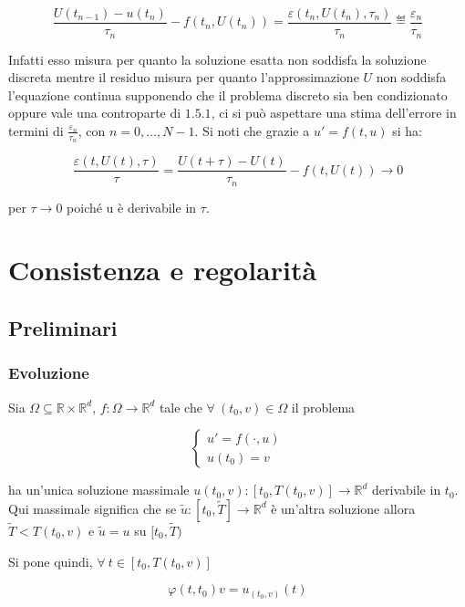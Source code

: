 \documentclass[hidelinks, 10pt]{report}
\begin{document}
\[
\frac{U(t_{n - 1}) - u(t_{n})}{\tau_{n}} - f(t_{n}, U(t_{n})) = \frac{\varepsilon(t_{n}, U(t_{n}),\tau_{n})}{\tau_{n}} \eqdef \frac{\varepsilon_{n}}{\tau_{n}}
\]

Infatti esso misura per quanto la soluzione esatta non soddisfa la soluzione discreta mentre il residuo misura per quanto l'approssimazione $ U $ non soddisfa l'equazione continua supponendo che il problema discreto sia ben condizionato oppure vale una controparte di $ 1.5.1 $, ci si pu\`o aspettare una stima dell'errore in termini di $ \frac{\varepsilon_{n}}{\tau_{n}} $, con $ n = 0, \dotsc, N - 1$. Si noti che grazie a $ u' = f(t, u) $ si ha:	%

\[ \frac{\varepsilon(t, U(t), \tau)}{\tau} = \frac{U(t + \tau) - U(t)}{\tau_{n}} - f(t, U(t)) \to 0 \]

per $ \tau \to 0 $ poich\'e u \`e derivabile in $ \tau $.

\chapter{Consistenza e regolarit\`a}
\setcounter{section}{6}
\section{Preliminari}
\subsection{Evoluzione}	\label{section:7.1}
Sia $ \Omega \subseteq \mathbb{R} \times \mathbb{R}^{d} $, $ f: \Omega \to \mathbb{R}^{d} $ tale che $ \forall\ (t_{0}, v) \in \Omega $ il problema

\begin{equation}	\label{eq:probevol}
\begin{cases}
u' = f(\cdot, u) \\
u(t_{0}) = v
\end{cases}
\end{equation}

ha un'unica soluzione massimale $ u(t_{0}, v) : [t_{0}, T(t_{0}, v)] \to \mathbb{R}^{d} $ derivabile in $ t_{0} $. Qui massimale significa che se $ \tilde{u} : [t_{0}, \tilde{T}] \to \mathbb{R}^{d} $ \`e un'altra soluzione allora $ \tilde{T} < T(t_{0}, v) $ e $ \tilde{u} = u $ su $ [t_{0}, \tilde{T}) $

Si pone quindi, $ \forall\ t \in [t_{0}, T(t_{0}, v)] $

\[ \varphi(t, t_{0}) v = u_{(t_{0}, v)} (t) \]
\end{document}
